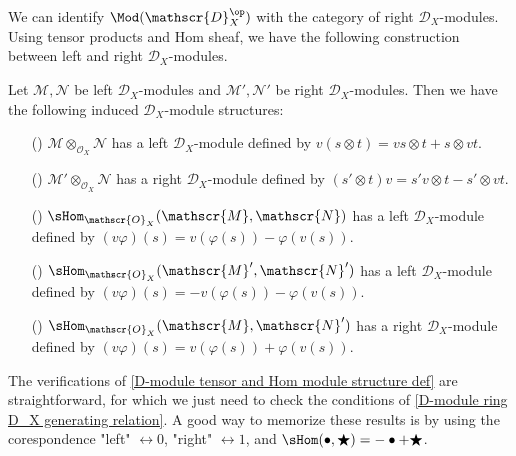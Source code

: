 We can identify $\Mod(\mathscr{D}_X^{\op})$ with the category of right $\mathscr{D}_X$-modules. Using tensor products and Hom sheaf, we have the following construction between left and right $\mathscr{D}_X$-modules.
\begin{proposition}\label{D-module tensor and Hom module structure def}
Let $\mathscr{M},\mathscr{N}$ be left $\mathscr{D}_X$-modules and $\mathscr{M}',\mathscr{N}'$ be right $\mathscr{D}_X$-modules. Then we have the following induced $\mathscr{D}_X$-module structures:
\begin{enumerate}
    \item[(\rmnum{1})] $\mathscr{M}\otimes_{\mathscr{O}_X}\mathscr{N}$ has a left $\mathscr{D}_X$-module defined by $v(s\otimes t)=vs\otimes t+s\otimes vt$.
    \item[(\rmnum{2})] $\mathscr{M}'\otimes_{\mathscr{O}_X}\mathscr{N}$ has a right $\mathscr{D}_X$-module defined by $(s'\otimes t)v=s'v\otimes t-s'\otimes vt$.
    \item[(\rmnum{3})] $\sHom_{\mathscr{O}_X}(\mathscr{M},\mathscr{N})$ has a left $\mathscr{D}_X$-module defined by $(v\varphi)(s)=v(\varphi(s))-\varphi(v(s))$.
    \item[(\rmnum{4})] $\sHom_{\mathscr{O}_X}(\mathscr{M}',\mathscr{N}')$ has a left $\mathscr{D}_X$-module defined by $(v\varphi)(s)=-v(\varphi(s))-\varphi(v(s))$.
    \item[(\rmnum{5})] $\sHom_{\mathscr{O}_X}(\mathscr{M},\mathscr{N}')$ has a right $\mathscr{D}_X$-module defined by $(v\varphi)(s)=v(\varphi(s))+\varphi(v(s))$. 
\end{enumerate}
\end{proposition}
The verifications of \cref{D-module tensor and Hom module structure def} are straightforward, for which we just need to check the conditions of \cref{D-module ring D_X generating relation}. A good way to memorize these results is by using the corespondence "left" $\leftrightarrow 0$, "right" $\leftrightarrow 1$, and $\sHom(\bullet,\bigstar)=-\bullet+\bigstar$.

